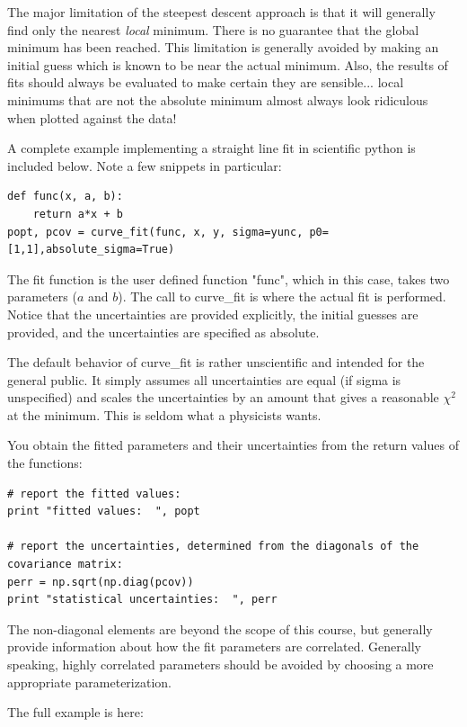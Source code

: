 \documentclass[12pt]{article}
\begin{document}
The major limitation of the steepest descent approach is that it will generally find only the nearest {\em local} minimum.  There is no guarantee that the global minimum has been reached.  This limitation is generally avoided by making an initial guess which is known to be near the actual minimum.  Also, the results of fits should always be evaluated to make certain they are sensible... local minimums that are not the absolute minimum almost always look ridiculous when plotted against the data!

A complete example implementing a straight line fit in scientific python is included below.  Note a few snippets in particular:
\begin{verbatim}
def func(x, a, b):
    return a*x + b
popt, pcov = curve_fit(func, x, y, sigma=yunc, p0=[1,1],absolute_sigma=True)
\end{verbatim}
The fit function is the user defined function "func", which in this case, takes two parameters ($a$ and $b$).  The call to curve\_fit is where the actual fit is performed.  Notice that the uncertainties are provided explicitly, the initial guesses are provided, and the uncertainties are specified as absolute.

The default behavior of curve\_fit is rather unscientific and intended for the general public.  It simply assumes all uncertainties are equal (if sigma is unspecified) and scales the uncertainties by an amount that gives a reasonable $\chi^2$ at the minimum.  This is seldom what a physicists wants.

You obtain the fitted parameters and their uncertainties from the return values of the functions:
\begin{verbatim}
# report the fitted values:
print "fitted values:  ", popt

# report the uncertainties, determined from the diagonals of the covariance matrix:
perr = np.sqrt(np.diag(pcov))
print "statistical uncertainties:  ", perr
\end{verbatim}
The non-diagonal elements are beyond the scope of this course, but generally provide information about how the fit parameters are correlated.  Generally speaking, highly correlated parameters should be avoided by choosing a more appropriate parameterization.

The full example is here:
\end{document}

